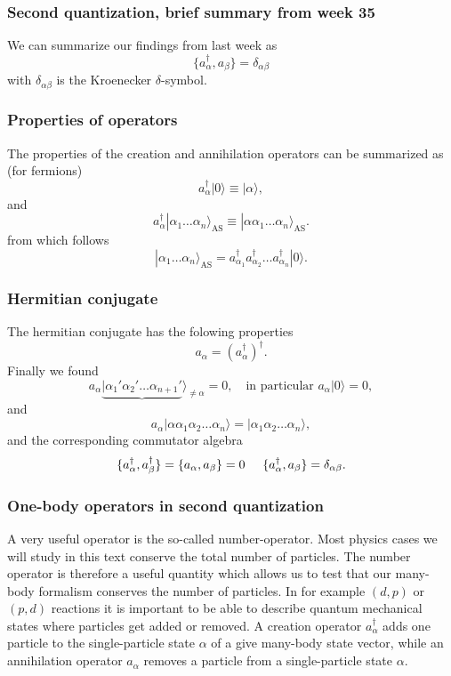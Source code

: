 \documentclass{beamer}
\begin{document}
\begin{frame}
\frametitle{Second quantization, brief summary from week 35}

We can summarize  our findings from last week as 
\begin{equation}
	\{a_\alpha^{\dagger},a_\beta \} = \delta_{\alpha\beta} \label{eq:2-20}
\end{equation}
with  $\delta_{\alpha\beta}$ is the Kroenecker $\delta$-symbol.
\end{frame}

\begin{frame}
\frametitle{Properties of operators}

The properties of the creation and annihilation operators can be summarized as (for fermions)
\[
	a_\alpha^{\dagger}|0\rangle \equiv  |\alpha\rangle,
\]
and
\[
	a_\alpha^{\dagger}|\alpha_1\dots \alpha_n\rangle_{\mathrm{AS}} \equiv  |\alpha\alpha_1\dots \alpha_n\rangle_{\mathrm{AS}}. 
\]
from which follows
\[
        |\alpha_1\dots \alpha_n\rangle_{\mathrm{AS}} = a_{\alpha_1}^{\dagger} a_{\alpha_2}^{\dagger} \dots a_{\alpha_n}^{\dagger} |0\rangle.
\]
\end{frame}

\begin{frame}
\frametitle{Hermitian conjugate}

The hermitian conjugate has the folowing properties
\[
        a_{\alpha} = ( a_{\alpha}^{\dagger} )^{\dagger}.
\]
Finally we found 
\[
	a_\alpha\underbrace{|\alpha_1'\alpha_2' \dots \alpha_{n+1}'}\rangle_{\neq \alpha} = 0, \quad
		\textrm{in particular } a_\alpha |0\rangle = 0,
\]
and
\[
 a_\alpha |\alpha\alpha_1\alpha_2 \dots \alpha_{n}\rangle = |\alpha_1\alpha_2 \dots \alpha_{n}\rangle,
\]
and the corresponding commutator algebra
\[
	\{a_{\alpha}^{\dagger},a_{\beta}^{\dagger}\} = \{a_{\alpha},a_{\beta}\} = 0 \hspace{0.5cm} 
\{a_\alpha^{\dagger},a_\beta \} = \delta_{\alpha\beta}.
\]
\end{frame}

\begin{frame}
\frametitle{One-body operators in second quantization}

A very useful operator is the so-called number-operator.  Most physics
cases we will study in this text conserve the total number of
particles.  The number operator is therefore a useful quantity which
allows us to test that our many-body formalism conserves the number of
particles.  In for example $(d,p)$ or $(p,d)$ reactions it is
important to be able to describe quantum mechanical states where
particles get added or removed.  A creation operator
$a_\alpha^{\dagger}$ adds one particle to the single-particle state
$\alpha$ of a give many-body state vector, while an annihilation
operator $a_\alpha$ removes a particle from a single-particle state
$\alpha$.
\end{frame}
\end{document}
